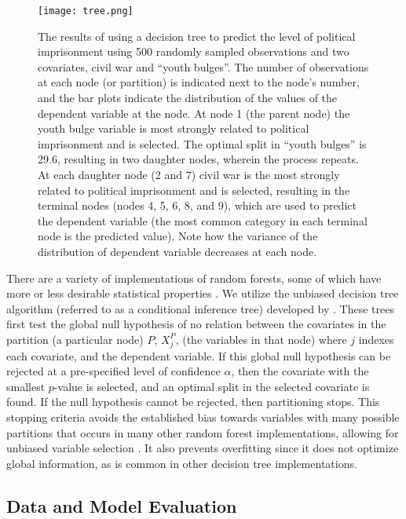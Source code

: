 \documentclass[12pt]{article}
\begin{document}
\begin{figure}[!htpb]
\centering
\texttt{[image: tree.png]}
\caption{The results of using a decision tree to predict the level of political imprisonment using 500 randomly sampled observations and two covariates, civil war and ``youth bulges''. The number of observations at each node (or partition) is indicated next to the node's number, and the bar plots indicate the distribution of the values of the dependent variable at the node. At node 1 (the parent node) the youth bulge variable is most strongly related to political imprisonment and is selected. The optimal split in ``youth bulges'' is 29.6, resulting in two daughter nodes, wherein the process repeats. At each daughter node (2 and 7) civil war is the most strongly related to political imprisonment and is selected, resulting in the terminal nodes (nodes 4, 5, 6, 8, and 9), which are used to predict the dependent variable (the most common category in each terminal node is the predicted value). Note how the variance of the distribution of dependent variable decreases at each node.}
\label{fig:tree}
\end{figure}

There are a variety of implementations of random forests, some of which have more or less desirable statistical properties \citep{strobl2009introduction}. We utilize the unbiased decision tree algorithm (referred to as a conditional inference tree) developed by \citet{hothorn2006unbiased}. These trees first test the global null hypothesis of no relation between the covariates in the partition (a particular node) $P$, $X_j^P$, (the variables in that node) where $j$ indexes each covariate, and the dependent variable. If this global null hypothesis can be rejected at a pre-specified level of confidence $\alpha$, then the covariate with the smallest $p$-value is selected, and an optimal split in the selected covariate is found. If the null hypothesis cannot be rejected, then partitioning stops. This stopping criteria avoids the established bias towards variables with many possible partitions that occurs in many other random forest implementations, allowing for unbiased variable selection \citep{hothorn2006unbiased, strobl2007bias}. It also prevents overfitting since it does not optimize global  information, as is common in other decision tree implementations.

\subsection{Data and Model Evaluation}
\end{document}
